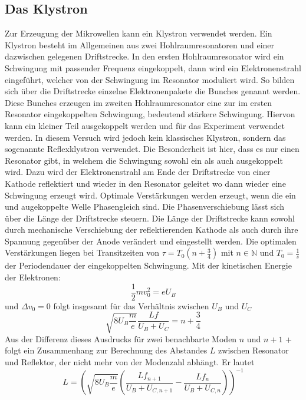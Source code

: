 \subsection{Das Klystron}
\label{sec:thklystron}
Zur Erzeugung der Mikrowellen kann ein Klystron verwendet werden. Ein Klystron besteht im Allgemeinen 
aus zwei Hohlraumresonatoren und einer dazwischen gelegenen Driftstrecke. In den ersten Hohlraumresonator 
wird ein Schwingung mit passender Frequenz eingekoppelt, dann wird ein Elektronenstrahl eingeführt, welcher 
von der Schwingung im Resonator moduliert wird. So bilden sich über die Driftstrecke 
einzelne Elektronenpakete die Bunches genannt werden. Diese Bunches erzeugen im zweiten Hohlraumresonator eine
zur im ersten Resonator eingekoppelten Schwingung, bedeutend stärkere Schwingung. Hiervon kann ein kleiner Teil 
ausgekoppelt werden und für das Experiment verwendet werden. In diesem Versuch wird jedoch kein klassisches
Klystron, sondern das sogenannte Reflexklystron verwendet. Die Besonderheit ist hier, dass es nur einen Resonator 
gibt, in welchem die Schwingung sowohl ein als auch ausgekoppelt wird. Dazu wird der Elektronenstrahl am Ende der 
Driftstrecke von einer Kathode reflektiert und wieder in den Resonator geleitet wo dann wieder eine Schwingung
erzeugt wird. Optimale Verstärkungen werden erzeugt, wenn die ein und augekoppelte Welle Phasengleich sind. 
Die Phasenverschiebung lässt sich über die Länge der Driftstrecke steuern. Die Länge der Driftstrecke kann 
sowohl durch mechanische Verschiebung der reflektierenden Kathode als auch durch ihre Spannung gegenüber 
der Anode verändert und eingestellt werden. Die optimalen Verstärkungen liegen bei Transitzeiten von
$\tau=T_0(n+\frac{3}{4})$ mit $n \in \mathbb{N}$ und $T_0=\frac{1}{s}$ der Periodendauer der eingekoppelten Schwingung.
Mit der kinetischen Energie der Elektronen:
\begin{equation}
    \frac{1}{2}mv_0^2=eU_B
\end{equation}
und $\Delta v_0=0$ folgt insgesamt für das Verhältnis zwischen $U_B$ und $U_C$
\begin{equation}
    \sqrt{8U_B\frac{m}{e}}\frac{Lf}{U_B+U_C}=n+\frac{3}{4}
\end{equation}
Aus der Differenz dieses Ausdrucks für zwei benachbarte Moden $n$ und $n+1$ +  folgt ein
Zusammenhang zur Berechnung des Abstandes $L$ zwischen Resonator und Reflektor, der
nicht mehr von der Modenzahl abhängt. Er lautet
\begin{equation}
    \label{eq:resonatorlange}
    L=\left( \sqrt{8U_B\frac{m}{e}}  \left(\frac{Lf_{n+1}}{U_B+U_{C,n+1}}-\frac{Lf_n}{U_B+U_{C,n}}\right)\right)^{-1}
\end{equation}
